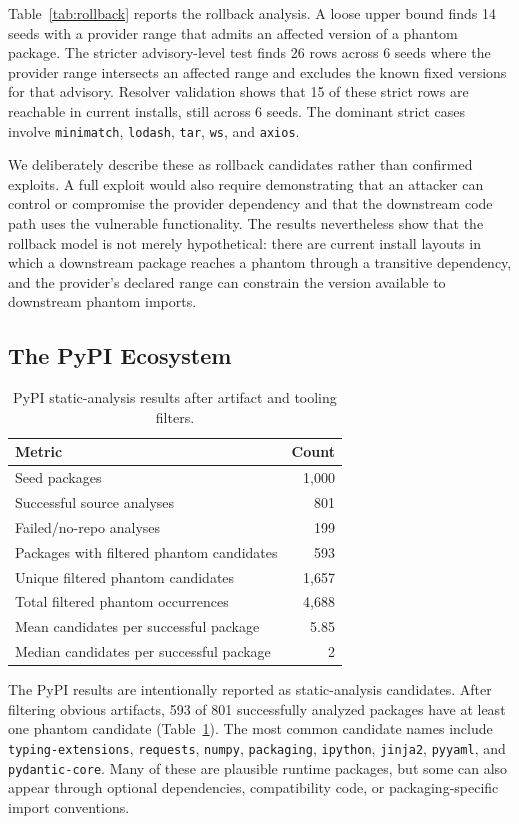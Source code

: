 \documentclass[letterpaper,twocolumn,10pt]{article}
\newcommand{\pypi}{PyPI\xspace}
\begin{document}
Table~\ref{tab:rollback} reports the rollback analysis.  A loose upper bound
finds 14 seeds with a provider range that admits an affected version of a
phantom package.  The stricter advisory-level test finds 26 rows across 6 seeds
where the provider range intersects an affected range and excludes the known
fixed versions for that advisory.  Resolver validation shows that 15 of these
strict rows are reachable in current installs, still across 6 seeds.  The
dominant strict cases involve \texttt{minimatch}, \texttt{lodash},
\texttt{tar}, \texttt{ws}, and \texttt{axios}.

We deliberately describe these as rollback candidates rather than confirmed
exploits.  A full exploit would also require demonstrating that an attacker can
control or compromise the provider dependency and that the downstream code path
uses the vulnerable functionality.  The results nevertheless show that the
rollback model is not merely hypothetical: there are current install layouts in
which a downstream package reaches a phantom through a transitive dependency,
and the provider's declared range can constrain the version available to
downstream phantom imports.

\subsection{The PyPI Ecosystem}

\begin{table}[t]
\centering
\small
\begin{tabular}{lr}
\toprule
Metric & Count \\
\midrule
Seed packages & 1,000 \\
Successful source analyses & 801 \\
Failed/no-repo analyses & 199 \\
Packages with filtered phantom candidates & 593 \\
Unique filtered phantom candidates & 1,657 \\
Total filtered phantom occurrences & 4,688 \\
Mean candidates per successful package & 5.85 \\
Median candidates per successful package & 2 \\
\bottomrule
\end{tabular}
\caption{PyPI static-analysis results after artifact and tooling filters.}
\label{tab:pypi}
\end{table}

The \pypi results are intentionally reported as static-analysis candidates.
After filtering obvious artifacts, 593 of 801 successfully analyzed packages
have at least one phantom candidate (Table~\ref{tab:pypi}).  The most common
candidate names include \texttt{typing-extensions}, \texttt{requests},
\texttt{numpy}, \texttt{packaging}, \texttt{ipython}, \texttt{jinja2},
\texttt{pyyaml}, and \texttt{pydantic-core}.  Many of these are plausible
runtime packages, but some can also appear through optional dependencies,
compatibility code, or packaging-specific import conventions.
\end{document}
